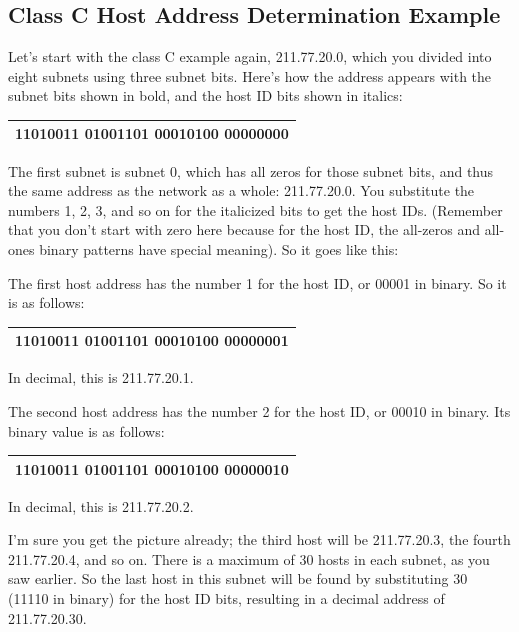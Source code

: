 \documentclass[b5paper,11pt]{memoir}
\begin{document}
\subsection[class C Host Address Determination
Example]{\texorpdfstring{\protect\hypertarget{ch19s05.htmlux5cux23class_c_host_address_determination_examp}{}{}Class
C Host Address Determination
Example}{class C Host Address Determination Example}}

Let's start with the class C example again, 211.77.20.0, which you
divided into eight subnets using three subnet bits. Here's how the
address appears with the subnet bits shown in bold, and the host ID bits
shown in italics:

\begin{longtable}[]{@{}l@{}}
\toprule
\endhead
11010011 01001101 00010100 {\textbf{000}}{00000}\tabularnewline
\bottomrule
\end{longtable}

The first subnet is subnet 0, which has all zeros for those subnet bits,
and thus the same address as the network as a whole: 211.77.20.0. You
substitute the numbers 1, 2, 3, and so on for the italicized bits to get
the host IDs. (Remember that you don't start with zero here because for
the host ID, the all-zeros and all-ones binary patterns have special
meaning). So it goes like this:

The first host address has the number 1 for the host ID, or 00001 in
binary. So it is as follows:

\begin{longtable}[]{@{}l@{}}
\toprule
\endhead
11010011 01001101 00010100 {\textbf{000}}{00001}\tabularnewline
\bottomrule
\end{longtable}

In decimal, this is 211.77.20.1.

The second host address has the number 2 for the host ID, or 00010 in
binary. Its binary value is as follows:

\begin{longtable}[]{@{}l@{}}
\toprule
\endhead
11010011 01001101 00010100 {\textbf{000}}{00010}\tabularnewline
\bottomrule
\end{longtable}

In decimal, this is 211.77.20.2.

I'm sure you get the picture already; the third host will be
211.77.20.3, the fourth 211.77.20.4, and so on. There is a maximum of 30
hosts in each subnet, as you saw earlier. So the last host in this
subnet will be found by substituting 30 (11110 in binary) for the host
ID bits, resulting in a decimal address of 211.77.20.30.
\end{document}
